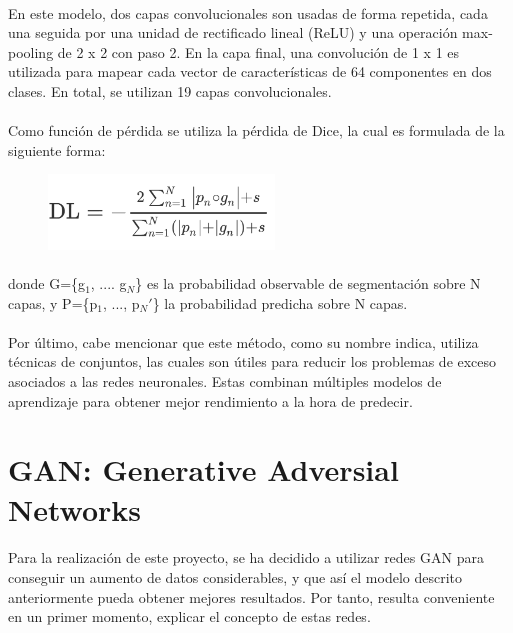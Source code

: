 \documentclass[12pt]{article}
\begin{document}
	\paragraph{}
	En este modelo, dos capas convolucionales son usadas de forma repetida, cada una seguida por una unidad de rectificado lineal (ReLU) y una operación max-pooling de 2 x 2 con paso 2. En la capa final, una convolución de 1 x 1 es utilizada para mapear cada vector de características de 64 componentes en dos clases. En total, se utilizan 19 capas convolucionales. 
	
	\paragraph{}
	Como función de pérdida se utiliza la pérdida de Dice, la cual es formulada de la siguiente forma:
	
	\begin{figure}[H]
	 	\centering
		\includegraphics[height=2cm]{dice_loss.png}
		\label{fig:Dice}
	\end{figure}
	
	\paragraph{}
	donde G=\{g$_{1}$, .... g$_{N}$\} es la probabilidad observable de segmentación sobre N capas, y P=\{p$_{1}$, ..., p$_{N}'$\} la probabilidad predicha sobre N capas.
	
	\paragraph{}
	Por último, cabe mencionar que este método, como su nombre indica, utiliza técnicas de conjuntos, las cuales son útiles para reducir los problemas de exceso asociados a las redes neuronales. Estas combinan múltiples modelos de aprendizaje para obtener mejor rendimiento a la hora de predecir.
	
	\newpage
	
	\section{GAN: Generative Adversial Networks}
	
	\paragraph{}
	Para la realización de este proyecto, se ha decidido a utilizar redes GAN para conseguir un aumento de datos considerables, y que así el modelo descrito anteriormente pueda obtener mejores resultados. Por tanto, resulta conveniente en un primer momento, explicar el concepto de estas redes.
	
\end{document}
